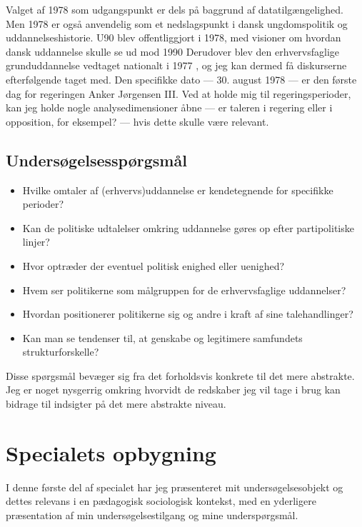 Valget af 1978 som udgangspunkt er dels på baggrund af datatilgængelighed.
Men 1978 er også anvendelig som et nedslagspunkt i dansk ungdomspolitik og uddannelseshistorie.
U90 blev offentliggjort i 1978, med visioner om hvordan dansk uddannelse skulle se ud mod 1990 \autocite{undervisningsministeriet90SamletUddannelsesplanlaegning1978}
Derudover blev den erhvervsfaglige grunduddannelse vedtaget nationalt i 1977 \autocite{thewikipediavolunteersEFG2019}, og jeg kan dermed få diskurserne efterfølgende taget med.
Den specifikke dato — 30. august 1978 — er den første dag for regeringen Anker Jørgensen III.
Ved at holde mig til regeringsperioder, kan jeg holde nogle analysedimensioner åbne — er taleren i regering eller i opposition, for eksempel? — hvis dette skulle være relevant.

\section{Undersøgelsesspørgsmål}\label{seq:resqs}

\begin{itemize}
  \item
    Hvilke omtaler af (erhvervs)uddannelse er kendetegnende for specifikke perioder?
  \item
    Kan de politiske udtalelser omkring uddannelse gøres op efter partipolitiske linjer?
  \item
    Hvor optræder der eventuel politisk enighed eller uenighed?
  \item
    Hvem ser politikerne som målgruppen for de erhvervsfaglige uddannelser?
  \item
    Hvordan positionerer politikerne sig og andre i kraft af sine talehandlinger?
  \item
    Kan man se tendenser til, at genskabe og legitimere samfundets strukturforskelle?
\end{itemize}

Disse spørgsmål bevæger sig fra det forholdsvis konkrete til det mere abstrakte.
Jeg er noget nysgerrig omkring hvorvidt de redskaber jeg vil tage i brug kan bidrage til indsigter på det mere abstrakte niveau.

\chapter{Specialets opbygning}
I denne første del af specialet har jeg præsenteret mit undersøgelsesobjekt og dettes relevans i en pædagogisk sociologisk kontekst, med en yderligere præsentation af min undersøgelsestilgang og mine underspørgsmål.

